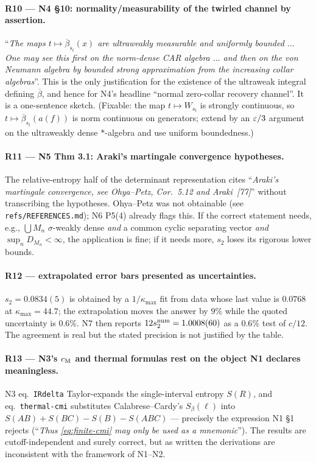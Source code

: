 \documentclass[11pt]{article}
\newcommand{\NI}{N1}\newcommand{\NII}{N2}\newcommand{\NIII}{N3}
\newcommand{\NIV}{N4}\newcommand{\NV}{N5}\newcommand{\NVI}{N6}\newcommand{\NVII}{N7}
\begin{document}
\paragraph{R10 --- \NIV{} \S10: normality/measurability of the twirled channel by assertion.}
``\emph{The maps $t\mapsto\overline\beta_{s_t}(x)$ are ultraweakly measurable and uniformly bounded $\dots$ One may see
this first on the norm-dense CAR algebra $\dots$ and then on the von Neumann algebra by bounded strong approximation
from the increasing collar algebras}''.  This is the only justification for the existence of the ultraweak integral
defining $\overline\beta$, and hence for \NIV's headline ``normal zero-collar recovery channel''.  It is a one-sentence
sketch.  (Fixable: the map $t\mapsto W_{s_t}$ is strongly continuous, so $t\mapsto\overline\beta_{s_t}(a(f))$ is norm
continuous on generators; extend by an $\varepsilon/3$ argument on the ultraweakly dense $*$-algebra and use uniform boundedness.)

\paragraph{R11 --- \NV{} Thm 3.1: Araki's martingale convergence hypotheses.}
The relative-entropy half of the determinant representation cites ``\emph{Araki's martingale convergence, see
Ohya--Petz, Cor.~5.12 and Araki~[77]}'' without transcribing the hypotheses.  Ohya--Petz was not obtainable
(see \texttt{refs/REFERENCES.md}); \NVI{} P5(4) already flags this.  If the correct statement needs, e.g.,
$\bigcup M_n$ $\sigma$-weakly dense \emph{and} a common cyclic separating vector \emph{and} $\sup_n D_{M_n}<\infty$,
the application is fine; if it needs more, $s_2$ loses its rigorous lower bounds.

\paragraph{R12 --- extrapolated error bars presented as uncertainties.}
$s_2=0.0834(5)$ is obtained by a $1/\kappa_{\max}$ fit from data whose last value is $0.0768$ at $\kappa_{\max}=44.7$;
the extrapolation moves the answer by $9\%$ while the quoted uncertainty is $0.6\%$.  \NVII{} then reports
$12s_2^{\rm num}=1.0008(60)$ as a $0.6\%$ test of $c/12$.  The agreement is real but the stated precision is not
justified by the table.

\paragraph{R13 --- \NIII's $c_{\rm M}$ and thermal formulas rest on the object \NI{} declares meaningless.}
\NIII{} eq.~\texttt{IRdelta} Taylor-expands the single-interval entropy $S(R)$, and eq.~\texttt{thermal-cmi}
substitutes Calabrese--Cardy's $S_\beta(\ell)$ into $S(AB)+S(BC)-S(B)-S(ABC)$ --- precisely the expression \NI{} \S1
rejects (``\emph{Thus \eqref{eq:finite-cmi} may only be used as a mnemonic}'').  The results are cutoff-independent and
surely correct, but as written the derivations are inconsistent with the framework of \NI--\NII.
\end{document}

